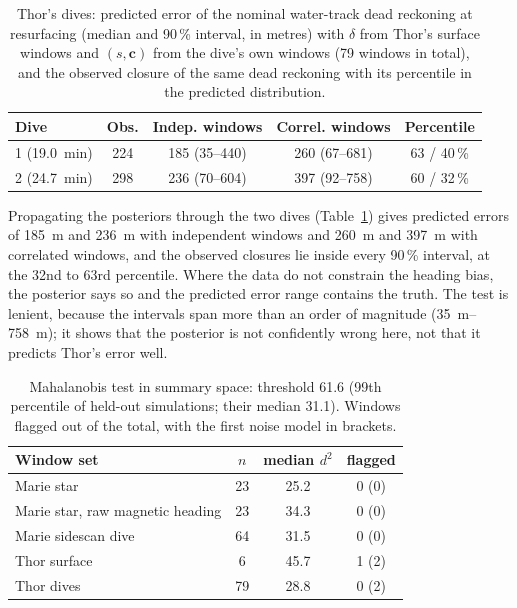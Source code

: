 \documentclass[conference]{IEEEtran}
\newcommand{\vect}[1]{\boldsymbol{#1}}
\begin{document}
\begin{table}[t]
\caption{Thor's dives: predicted error of the nominal water-track dead reckoning at resurfacing (median and 90\,\% interval, in metres) with $\delta$ from Thor's surface windows and $(s,\vect{c})$ from the dive's own windows (79 windows in total), and the observed closure of the same dead reckoning with its percentile in the predicted distribution.}
\label{tab:thor}
\centering
\footnotesize
\setlength{\tabcolsep}{3pt}
\begin{tabular}{@{}lcccc@{}}
\toprule
Dive & Obs. & Indep. windows & Correl. windows & Percentile \\
\midrule
1 (\SI{19.0}{\minute}) & 224 & 185 (35--440) & 260 (67--681) & 63 / 40\,\% \\
2 (\SI{24.7}{\minute}) & 298 & 236 (70--604) & 397 (92--758) & 60 / 32\,\% \\
\bottomrule
\end{tabular}
\end{table}

Propagating the posteriors through the two dives (Table~\ref{tab:thor}) gives predicted errors of \SI{185}{\meter} and \SI{236}{\meter} with independent windows and \SI{260}{\meter} and \SI{397}{\meter} with correlated windows, and the observed closures lie inside every 90\,\% interval, at the 32nd to 63rd percentile. Where the data do not constrain the heading bias, the posterior says so and the predicted error range contains the truth. The test is lenient, because the intervals span more than an order of magnitude (\SIrange{35}{758}{\meter}); it shows that the posterior is not confidently wrong here, not that it predicts Thor's error well.

\begin{table}[t]
\caption{Mahalanobis test in summary space: threshold \num{61.6} (99th percentile of held-out simulations; their median 31.1). Windows flagged out of the total, with the first noise model in brackets.}
\label{tab:detect}
\centering
\footnotesize
\begin{tabular}{@{}lccc@{}}
\toprule
Window set & $n$ & median $d^2$ & flagged \\
\midrule
Marie star & 23 & 25.2 & 0 (0) \\
Marie star, raw magnetic heading & 23 & 34.3 & 0 (0) \\
Marie sidescan dive & 64 & 31.5 & 0 (0) \\
Thor surface & 6 & 45.7 & 1 (2) \\
Thor dives & 79 & 28.8 & 0 (2) \\
\bottomrule
\end{tabular}
\end{table}
\end{document}
